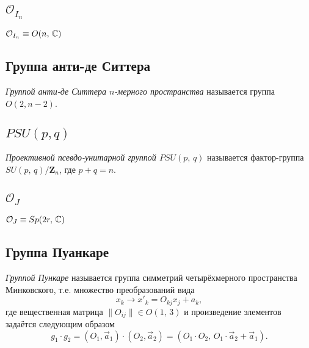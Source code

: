 \documentclass[a4paper,12pt]{article}
\begin{document}
\subsection{$\mathcal{O}_{I_n}$ }
$\mathcal{O}_{I_n} \equiv O(n,\,\mathbb{C})$
\subsection{Группа анти-де Ситтера}
\begin{dfn}
	\emph{Группой анти-де Ситтера $n$-мерного пространства} называется
	группа $O(2,n-2)$.
\end{dfn}
\subsection{$PSU(p, q)$ }
\begin{dfn}
	\emph{Проективной псевдо-унитарной группой $PSU(p,\,q)$} называется
	фактор-группа $SU(p,\,q) / \mathbf{Z}_n$, где  $p+q=n$.
\end{dfn}
\subsection{$\mathcal{O}_{J}$ }
$\mathcal{O}_{J} \equiv Sp(2r,\, \mathbb{C})$
\subsection{Группа Пуанкаре}
\begin{dfn}
	\emph{Группой Пункаре} называется группа симметрий четырёхмерного
	пространства Минковского, т.е. множество преобразований вида
	\begin{equation}
		x_k \to x'_k = O_{kj}x_j+a_k
	,\end{equation}
	где вещественная матрица $\|O_{ij}\| \in O(1,\,3)$ и произведение
	элементов задаётся следующим образом
	\begin{equation}
		g_1 \cdot g_2 = (O_1, \vec{a}_1) \cdot  (O_2, \vec{a}_2) =
		(O_1 \cdot O_2,\, O_1 \cdot \vec{a}_2 + \vec{a}_1)
	.\end{equation}
\end{dfn}
\end{document}
